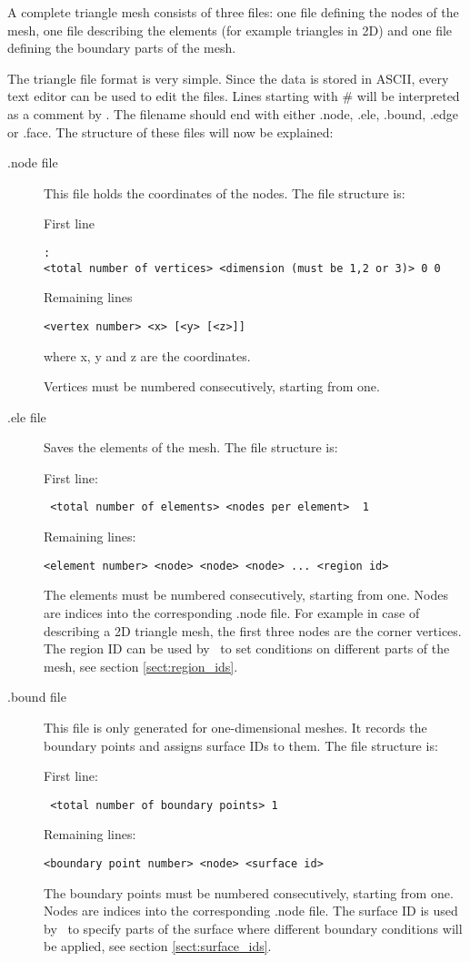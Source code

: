A complete triangle mesh consists of three files: one file defining the
nodes of the mesh, one file describing the elements (for example triangles
in 2D) and one file defining the boundary parts of the mesh.

The triangle file format is very simple. Since the data is stored in ASCII,
every text editor can be used to edit the files.  Lines starting with \# will
be interpreted as a comment by \fluidity.  The filename should end with
either .node, .ele, .bound, .edge or .face.  The structure of these files
will now be explained:

\begin{description}
\item[.node file]
This file holds the coordinates of the nodes. The file structure is:

First line
\begin{lstlisting}: 
<total number of vertices> <dimension (must be 1,2 or 3)> 0 0
\end{lstlisting}
Remaining lines
\begin{lstlisting}
<vertex number> <x> [<y> [<z>]]
\end{lstlisting} 
where x, y and z are the coordinates.

Vertices must be numbered consecutively, starting from one. 

\item[.ele file] Saves the elements of the mesh. The file structure is:

First line:
\begin{lstlisting}
 <total number of elements> <nodes per element>  1
\end{lstlisting}
Remaining lines:
\begin{lstlisting} 
<element number> <node> <node> <node> ... <region id>
\end{lstlisting}  
The elements must be numbered consecutively, starting from one. Nodes are
indices into the corresponding .node file. For example in case of describing
a 2D triangle mesh, the first three nodes are the corner vertices. The
region ID can be used by \fluidity\ to set conditions on different parts of
the mesh, see section \ref{sect:region_ids}.

\item[.bound file] This file is only generated for one-dimensional meshes.
  It records the boundary points and assigns surface IDs to them. The file
  structure is:

First line:
\begin{lstlisting}
 <total number of boundary points> 1
\end{lstlisting}
Remaining lines:
\begin{lstlisting} 
<boundary point number> <node> <surface id>
\end{lstlisting}  
The boundary points must be numbered consecutively, starting from one. Nodes
are indices into the corresponding .node file. The surface ID is used by
\fluidity\ to specify parts of the surface where different boundary
conditions will be applied, see section \ref{sect:surface_ids}.


\end{description}
